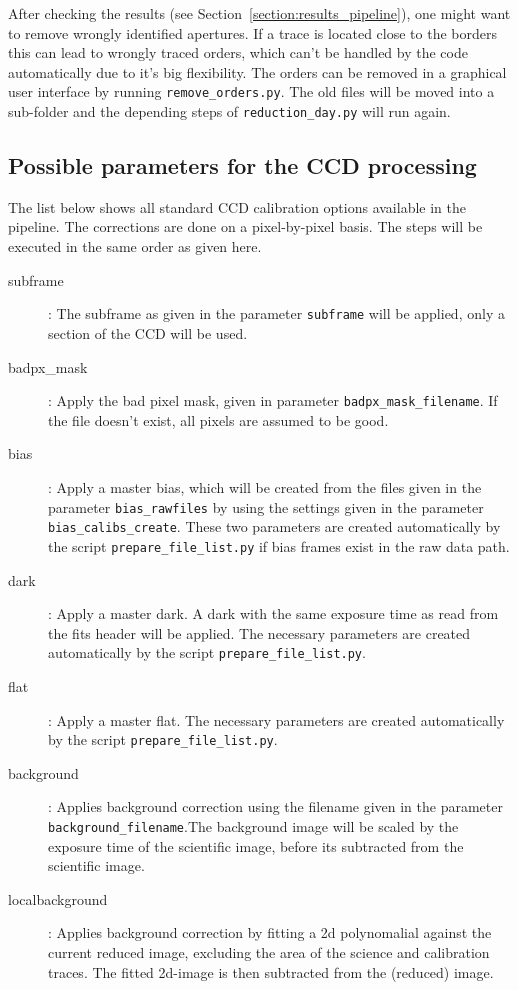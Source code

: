\documentclass[10pt,a4paper]{article}
\begin{document}
\noindent After checking the results (see Section~\ref{section:results_pipeline}), one might want to remove wrongly identified apertures. If a trace is located close to the borders this can lead to wrongly traced orders, which can't be handled by the code automatically due to it's big flexibility. The orders can be removed in a graphical user interface by running \verb|remove_orders.py|. The old files will be moved into a sub-folder and the depending steps of \verb|reduction_day.py| will run again.

\subsection{Possible parameters for the CCD processing}
\label{Section:parameters_CCD_proc}
\noindent The list below shows all standard CCD calibration options available in the pipeline. The corrections are done on a pixel-by-pixel basis. The steps will be executed in the same order as given here.
\begin{description}
  \item[subframe] : The subframe as given in the parameter \verb|subframe| will be applied, only a section of the CCD will be used.
  \item[badpx\_mask] : Apply the bad pixel mask, given in parameter \verb|badpx_mask_filename|. If the file doesn't exist, all pixels are assumed to be good.
  \item[bias] : Apply a master bias, which will be created from the files given in the parameter \verb|bias_rawfiles| by using the settings given in the parameter \verb|bias_calibs_create|. These two parameters are created automatically by the script \verb|prepare_file_list.py| if bias frames exist in the raw data path.
  \item[dark] : Apply a master dark. A dark with the same exposure time as read from the fits header will be applied. The necessary parameters are created automatically by the script \verb|prepare_file_list.py|.
  \item[flat] : Apply a master flat. The necessary parameters are created automatically by the script \verb|prepare_file_list.py|.
  \item[background] : Applies background correction using the filename given in the parameter \verb|background_filename|.The background image will be scaled by the exposure time of the scientific image, before its subtracted from the scientific image.
  \item[localbackground] : Applies background correction by fitting a 2d polynomalial against the current reduced image, excluding the area of the science and calibration traces. The fitted 2d-image is then subtracted from the (reduced) image.
\end{description}
\end{document}
